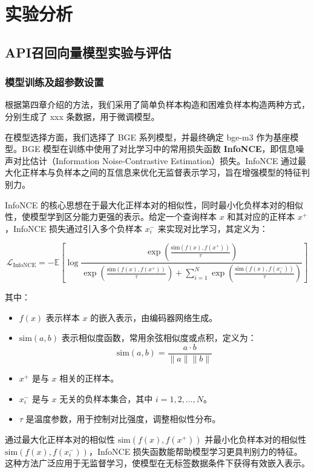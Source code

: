 \chapter{实验分析}

\section{API召回向量模型实验与评估}

\subsection{模型训练及超参数设置}

根据第四章介绍的方法，我们采用了简单负样本构造和困难负样本构造两种方式，分别生成了 xxx 条数据，用于微调模型。

在模型选择方面，我们选择了 BGE 系列模型，并最终确定 bge-m3 作为基座模型。BGE 模型在训练中使用了对比学习中的常用损失函数 \textbf{InfoNCE}，即信息噪声对比估计（Information Noise-Contrastive Estimation）损失。InfoNCE 通过最大化正样本与负样本之间的互信息来优化无监督表示学习，旨在增强模型的特征判别力。

InfoNCE 的核心思想在于最大化正样本对的相似性，同时最小化负样本对的相似性，使模型学到区分能力更强的表示。给定一个查询样本 \( x \) 和其对应的正样本 \( x^+ \)，InfoNCE 损失通过引入多个负样本 \( x_i^- \) 来实现对比学习，其定义为：

\[
\mathcal{L}_{\text{InfoNCE}} = - \mathbb{E} \left[ \log \frac{\exp\left(\frac{\text{sim}(f(x), f(x^+))}{\tau}\right)}{\exp\left(\frac{\text{sim}(f(x), f(x^+))}{\tau}\right) + \sum_{i=1}^{N} \exp\left(\frac{\text{sim}(f(x), f(x_i^-))}{\tau}\right)} \right]
\]

其中：
\begin{itemize}
    \item \( f(x) \) 表示样本 \( x \) 的嵌入表示，由编码器网络生成。
    \item \( \text{sim}(a, b) \) 表示相似度函数，常用余弦相似度或点积，定义为：
    \[
    \text{sim}(a, b) = \frac{a \cdot b}{\|a\| \|b\|}
    \]
    \item \( x^+ \) 是与 \( x \) 相关的正样本。
    \item \( x_i^- \) 是与 \( x \) 无关的负样本集合，其中 \( i = 1, 2, \dots, N \)。
    \item \( \tau \) 是温度参数，用于控制对比强度，调整相似性分布。
\end{itemize}

通过最大化正样本对的相似性 \( \text{sim}(f(x), f(x^+)) \) 并最小化负样本对的相似性 \( \text{sim}(f(x), f(x_i^-)) \)，InfoNCE 损失函数能帮助模型学习更具判别力的特征。这种方法广泛应用于无监督学习，使模型在无标签数据条件下获得有效嵌入表示。

